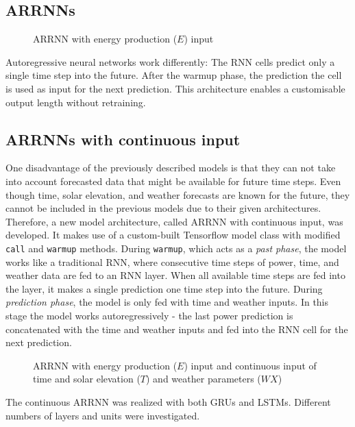 \documentclass[11pt,table]{article}
\begin{document}
\subsection{\Aclp{ARRNN}}
\begin{figure}[hpt]
	\centering
	
	\caption{\Ac{ARRNN} with energy production ($E$) input}
	\label{fig:ARRNN}
\end{figure}
Autoregressive neural networks work differently: 
The \ac{RNN} cells predict only a single time step into the future. After the warmup phase, the prediction the cell is used as input for the next prediction. This architecture enables a customisable output length without retraining.

\subsection{\Acp{ARRNN} with continuous input}

One disadvantage of the previously described models is that they can not take into account forecasted data that might be available for future time steps. Even though time, solar elevation, and weather forecasts are known for the future, they cannot be included in the previous models due to their given architectures. Therefore, a new model architecture, called \ac{ARRNN} with continuous input, was developed. It makes use of a custom-built Tensorflow model class with modified \texttt{call} and \texttt{warmup} methods. During  \texttt{warmup}, which acts as a \textit{past phase}, the model works like a traditional RNN, where consecutive time steps of power, time, and weather data are fed to an RNN layer. When all available time steps are fed into the layer, it makes a single prediction one time step into the future. During \textit{prediction phase}, the model is only fed with time and weather inputs. In this stage the model works autoregressively - the last power prediction is concatenated with the time and weather inputs and fed into the RNN cell for the next prediction.

\begin{figure}[ht]
	\centering
	
	\caption{\Ac{ARRNN} with energy production ($E$) input and continuous input of time and solar elevation ($T$) and weather parameters ($\textit{WX}$)}
	\label{fig:continousARRNN}
\end{figure}

The continuous \ac{ARRNN} was realized with both \acp{GRU} and \acp{LSTM}. Different numbers of layers and units were investigated.
\end{document}
